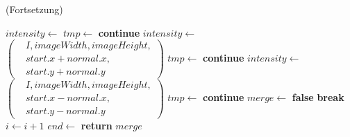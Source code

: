 \begin{algorithm}[!ht]
\caption{ (Fortsetzung)}
\label{alg:extendline2}
\begin{algorithmic}[1]
	\State $\mathit{intensity} \gets$ 
	\label{alg:extendline2-orientation-start}
	\State $\mathit{tmp} \gets$ 
	\label{alg:extendline2-orientation-end}
	\label{alg:extendline2-iscompatible}
		\State \textbf{continue}
	\EndIf
	\State $\mathit{intensity} \gets$ 
	$\left(
	\begin{aligned}
		& I, \mathit{imageWidth}, \mathit{imageHeight},\\
		& \mathit{start.x} + \mathit{normal.x},\\
		& \mathit{start.y} + normal.y
	\end{aligned}\right)$
	\label{alg:extendline2-pointabove}
	\State $\mathit{tmp} \gets$ 
		\State \textbf{continue}
	\EndIf
	\State $\mathit{intensity} \gets$ 
	$\left(
	\begin{aligned}
		& I, \mathit{imageWidth}, \mathit{imageHeight},\\
		& \mathit{start.x} - \mathit{normal.x},\\
		& \mathit{start.y} - normal.y
	\end{aligned}\right)$
	\label{alg:extendline2-pointbelow}
	\State $\mathit{tmp} \gets$ 
		\State \textbf{continue}
	\EndIf
	\State $\mathit{merge} \gets$ \textbf{false}
	\label{alg:extendline2-false}
	\State \textbf{break}
	\State $i \gets i + 1$
	\EndFor
	\label{alg:extendline2-loop-end}
	\State $\mathit{end} \gets$ 
	\label{alg:extendline2-endofline}
	\State \textbf{return} $\mathit{merge}$
	\label{alg:extendline2-return}
\end{algorithmic}
\end{algorithm}
